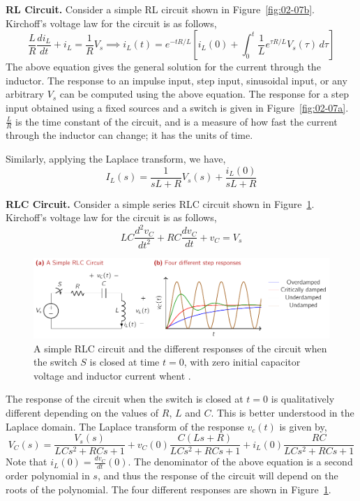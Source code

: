 \noindent\textbf{RL Circuit.} Consider a simple RL circuit shown in Figure~\ref{fig:02-07b}. Kirchoff's voltage law for the circuit is as follows,
\begin{equation}
    \frac{L}{R} \frac{di_L}{dt} + i_L = \frac{1}{R}V_s \implies i_L(t) = e^{-tR/L} \left[ i_{L}(0) + \int_0^t \frac{1}{L} e^{\tau R/L} V_s(\tau)\, d\tau \right]
    \label{eq:02-30}
\end{equation}
The above equation gives the general solution for the current through the inductor. The response to an impulse input, step input, sinusoidal input, or any arbitrary $V_s$ can be computed using the above equation. The response for a step input obtained using a fixed sources and a switch is given in Figure~\ref{fig:02-07a}. $\frac{L}{R}$ is the time constant of the circuit, and is a measure of how fast the current through the inductor can change; it has the units of time.

Similarly, applying the Laplace transform, we have,
\begin{equation}
    I_L(s) = \frac{1}{sL + R} V_s(s) + \frac{i_L(0)}{sL + R}
    \label{eq:02-31}
\end{equation}

\noindent\textbf{RLC Circuit.} Consider a simple series RLC circuit shown in Figure~\ref{fig:02-08}. Kirchoff's voltage law for the circuit is as follows,
\begin{equation}
    LC\frac{d^2 v_C}{dt^2} + RC \frac{d v_C}{dt} + v_C = V_s 
    \label{eq:02-32}
\end{equation}
\begin{figure}[t]
    \centering
    \includegraphics[width=\textwidth]{figure/ch02/fig02-08.pdf}
    \caption{A simple RLC circuit and the different responses of the circuit when the switch $S$ is closed at time $t = 0$, with  zero initial capacitor voltage and inductor current whent .}
    \label{fig:02-08}
\end{figure}
The response of the circuit when the switch is closed at $t=0$ is qualitatively different depending on the values of $R$, $L$ and $C$. This is better understood in the Laplace domain. The Laplace transform of the response $v_c(t)$ is given by,
\begin{equation}
    V_C(s) = \frac{V_s(s)}{LCs^2 + RCs + 1} + v_C(0)\frac{C\left(Ls + R\right)}{LCs^2 + RCs + 1} + i_L(0)\frac{RC}{LCs^2 + RCs + 1}
    \label{eq:02-33}
\end{equation}
Note that $i_L(0) = \frac{d v_C}{dt}(0)$. The denominator of the above equation is a second order polynomial in $s$, and thus the response of the circuit will depend on the roots of the polynomial. The four different responses are shown in Figure~\ref{fig:02-08}.

